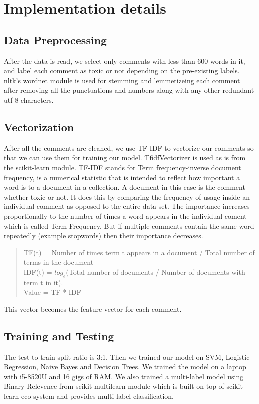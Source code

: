 \documentclass[11pt]{article}
\begin{document}


\section{Implementation details}
\subsection*{Data Preprocessing}
After the data is read, we select only comments with less than 600 words in it, 
and label each comment as toxic or not depending on the pre-existing labels.
nltk's wordnet module is used for stemming and lemmetizeing each comment 
after removing all the punctuations and numbers along with any other 
redundant utf-8 characters.
\subsection*{Vectorization} 
After all the comments are cleaned, we use TF-IDF to vectorize 
our comments so that we can use them for training our model. 
TfidfVectorizer is used as is from the scikit-learn module. TF-IDF stands for 
Term frequency-inverse document frequency, is a numerical statistic that is
intended to reflect how important a word is to a document in a collection.
A document in this case is the comment whether toxic or not. 
It does this by comparing the frequency of usage inside an individual comment
as opposed to the entire data set. 
The importance increases proportionally to the number of times a word appears in the 
individual coment which is called Term Frequency. 
But if multiple comments contain the same word repeatedly (example stopwords) 
then their importance decreases. \\

\begin{quote}
TF(t) = Number of times term t appears in a document / Total number of terms in the document\\
IDF(t) = $log_e$(Total number of documents / Number of documents with term t in it). \\
Value = TF * IDF
\end{quote}
This vector becomes the feature vector for each comment. 

\subsection*{Training and Testing}
The test to train split ratio is 3:1. Then we trained our model on SVM, Logistic Regression, Naive Bayes and Decision Trees.
We trained the model on a laptop with i5-8520U and 16 gigs of RAM.
We also trained a multi-label model using Binary Relevence from scikit-multilearn module 
which is built on top of scikit-learn eco-system and provides multi label classification.\\
\end{document}
